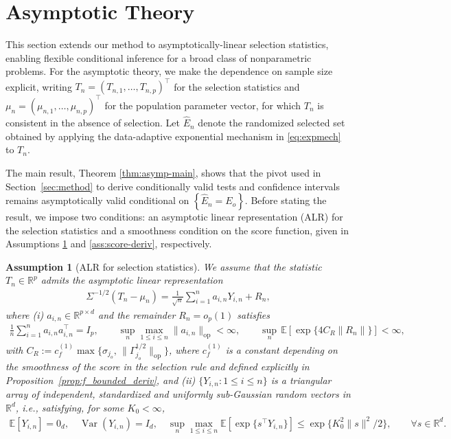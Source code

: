 \documentclass[12pt]{article}
\newcommand{\op}{\mathrm{op}}
\newcommand{\cbracket}[1]{\left\{ #1 \right\}}
\newtheorem{assumption}{Assumption}
\newcommand{\Var}{\operatorname{Var}}
\newcommand{\real}{\mathbb{R}}
\newcommand{\Ee}{{\mathbb{E}}}
\newcommand{\Ehat}{\widehat{E}}
\begin{document}
\section{Asymptotic Theory}
\label{sec:asymptotic}

This section extends our method to asymptotically-linear selection statistics, enabling flexible conditional inference for a broad class of nonparametric problems.
For the asymptotic theory, we make the dependence on sample size explicit, writing $T_n=(T_{n,1},\ldots,T_{n,p})^\top$ for the selection statistics and $\mu_n=(\mu_{n,1},\ldots,\mu_{n,p})^\top$ for the population parameter vector, for which $T_n$ is consistent in the absence of selection. 
Let $\Ehat_n$ denote the randomized selected set obtained by applying the data-adaptive exponential mechanism in \eqref{eq:expmech} to $T_n$.

The main result, Theorem \ref{thm:asymp-main}, shows that the pivot used in Section~\ref{sec:method} to derive conditionally valid tests and confidence intervals remains asymptotically valid conditional on $\cbracket{\Ehat_n=E_o}$.
Before stating the result, we impose two conditions: an asymptotic linear representation (ALR) for the selection statistics and a smoothness condition on the score function, given in Assumptions \ref{ass:linearizable} and \ref{ass:score-deriv}, respectively.

\begin{assumption}[ALR for selection statistics]
\label{ass:linearizable}
We assume that the statistic $T_n\in\real^p$ admits the asymptotic linear representation
\begin{align}
\label{eq:Talr}
  \Sigma^{-1/2}(T_n-\mu_n)
  =
  \frac{1}{\sqrt n}\sum_{i=1}^n a_{i,n}Y_{i,n}+R_n,
\end{align}
where (i) $a_{i,n}\in\real^{p\times d}$ and the remainder $R_n=o_p(1)$ satisfies 
\begin{align*}
  \frac{1}{n}\sum_{i=1}^n a_{i,n}a_{i,n}^{\top}=I_p,
  \qquad
  \sup_{n}\max_{1\le i\le n}\|a_{i,n}\|_{\op}<\infty,
  \qquad
  \sup_n\,\Ee\!\left[\exp\{4C_R\|R_n\|\}\right]<\infty,
\end{align*}
with $C_R:=c_f^{(1)}\max\!\big\{\sigma_{j_o},\,
\|\Gamma_{j_o}^{1/2}\|_{\op}\}$, where
$c_f^{(1)}$ is a constant depending on the smoothness of the score in the selection rule and defined explicitly in Proposition~\ref{prop:f_bounded_deriv}, 
and (ii) $\{Y_{i,n}:1\le i\le n\}$ is a triangular array of independent, standardized and uniformly sub-Gaussian random vectors in $\real^d$,  i.e., satisfying, for some $K_0<\infty$,
\begin{align*}
  \Ee[Y_{i,n}]=0_d,
  \quad
  \Var(Y_{i,n})=I_d,
  \quad
  \sup_{n}\max_{1\le i\le n}
  \Ee[\exp\{s^\top Y_{i,n}\}]
  \le
  \exp\{K_0^2\|s\|^2/2\},
  \qquad
  \forall s\in\real^d.
\end{align*}
\end{assumption}
\end{document}
